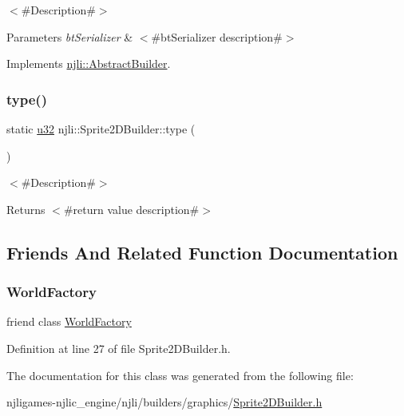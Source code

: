 $<$\#\+Description\#$>$


\begin{DoxyParams}{Parameters}
{\em bt\+Serializer} & $<$\#bt\+Serializer description\#$>$ \\
\hline
\end{DoxyParams}


Implements \mbox{\hyperlink{classnjli_1_1_abstract_builder_ab66b774e02ccb9da554c9aab7fa6d981}{njli\+::\+Abstract\+Builder}}.

\mbox{\label{classnjli_1_1_sprite2_d_builder_a7804c520fd7ccac9d391bb95ae5cc1c1}} 
\subsubsection{\texorpdfstring{type()}{type()}}
{\footnotesize\ttfamily static \mbox{\hyperlink{_util_8h_a10e94b422ef0c20dcdec20d31a1f5049}{u32}} njli\+::\+Sprite2\+D\+Builder\+::type (\begin{DoxyParamCaption}{ }\end{DoxyParamCaption})\hspace{0.3cm}{\ttfamily [static]}}

$<$\#\+Description\#$>$

\begin{DoxyReturn}{Returns}
$<$\#return value description\#$>$ 
\end{DoxyReturn}


\subsection{Friends And Related Function Documentation}
\mbox{\label{classnjli_1_1_sprite2_d_builder_acb96ebb09abe8f2a37a915a842babfac}} 
\subsubsection{\texorpdfstring{World\+Factory}{WorldFactory}}
{\footnotesize\ttfamily friend class \mbox{\hyperlink{classnjli_1_1_world_factory}{World\+Factory}}\hspace{0.3cm}{\ttfamily [friend]}}



Definition at line 27 of file Sprite2\+D\+Builder.\+h.



The documentation for this class was generated from the following file\+:\begin{DoxyCompactItemize}
\item 
njligames-\/njlic\+\_\+engine/njli/builders/graphics/\mbox{\hyperlink{_sprite2_d_builder_8h}{Sprite2\+D\+Builder.\+h}}\end{DoxyCompactItemize}
